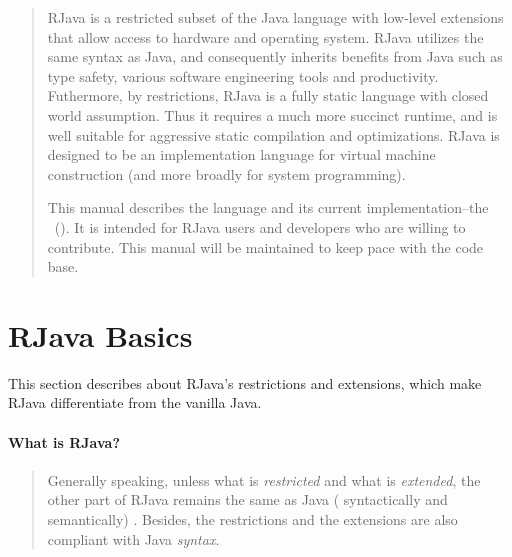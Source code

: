 \documentclass[12pt]{article}
\begin{document}
\newcommand{\msout}[1]{\text{\sout{\ensuremath{#1}}}}

\maketitle

\begin{abstract}
RJava is a restricted subset of the Java language 
with low-level extensions
that allow access to hardware and operating system. 
RJava utilizes the same syntax as Java, and consequently
inherits benefits from Java such as type safety, 
various software engineering tools and productivity. Futhermore, 
by restrictions, RJava is a fully static language with closed world
assumption. Thus it requires a much more succinct runtime, and
is well suitable for aggressive static compilation and optimizations. 
RJava is designed to be an implementation language for virtual machine
construction (and more broadly for system programming). 

This manual describes the language and its 
current implementation--the \rjcfull~(\rjc). It is intended for RJava users
and developers who are willing to contribute. This manual will be
maintained to keep pace with the \rjc code base. 
\end{abstract}
\clearpage

\setcounter{secnumdepth}{5}
\setcounter{tocdepth}{5}
\tableofcontents 
\clearpage


\section{RJava Basics}

This section describes about RJava's restrictions and extensions, 
which make RJava differentiate from the vanilla Java. 

\paragraph*{What is RJava?}
\begin{quotation}
Generally speaking, unless what is \emph{restricted} and 
what is \emph{extended},
the other part of RJava remains the same as Java (
syntactically and semantically) . Besides,
the restrictions and the extensions are also
compliant with Java \emph{syntax}. 
\end{quotation}
\end{document}

